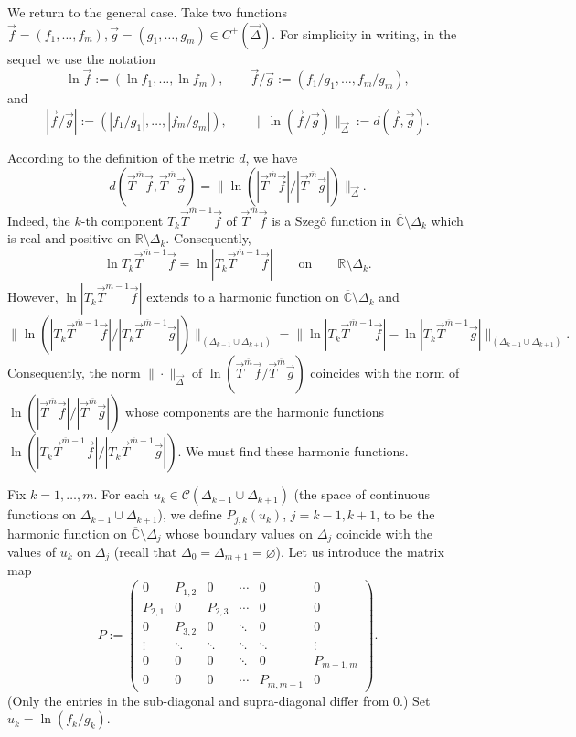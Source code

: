 \documentclass{amsart}
\numberwithin{equation}{section}
\theoremstyle{definition}
\newcommand{\RR}{\mathbb{R}}      %
\newcommand{\CC}{\mathbb{C}}      %
\begin{document}
 We return to the general case. Take two functions $\vec{f} = (f_1,\ldots,f_m), \vec{g} = (g_1,\ldots,g_m) \in {C}^+( \vec{\Delta}) $. For simplicity in writing, in the sequel we use the notation
 \[ \ln \vec{f} := (\ln f_1,\ldots, \ln f_m), \qquad  { \vec{f}}/{ \vec{g}} := (f_1/g_1,\ldots,f_m/g_m),
 \]
 and
 \[ |{ \vec{f}}/{ \vec{g}}| := (|f_1/g_1|,\ldots,|f_m/g_m|), \qquad \|\ln({ \vec{f}}/{ \vec{g}} )\|_{\vec{\Delta}} := d(\vec{f},\vec{g}).
 \]

According to the definition of the metric $d$, we have
 \begin{equation}
 	\label{formulad}
 	d( \vec{T}^{\overline{m}}\vec{f}, \vec{T}^{\overline{m}} \vec{g} ) =  \| \ln (|\vec{T}^{\overline{m}} \vec{f}|/|\vec{T}^{\overline{m}} \vec{g}| )\|_{\vec{\Delta}}.
 \end{equation}
 Indeed, the $k$-th component $T_k \vec{T}^{\overline{m}-1}\vec{f} $ of $\vec{T}^{\overline{m}}\vec{f}$ is a Szeg\H{o} function in $\overline{\CC} \setminus \Delta_k$ which is real and positive on $\RR \setminus \Delta_k$. Consequently,
 \[
   \ln T_k \vec{T}^{\overline{m}-1}\vec{f}= \ln |T_k \vec{T}^{\overline{m}-1}\vec{f}|\qquad  \mbox{on}\qquad {\RR \setminus \Delta_k}.
 \]
 However, $\ln |T_k \vec{T}^{\overline{m}-1}\vec{f}|$ extends to a harmonic function on $\overline{\CC} \setminus \Delta_k$ and
 \[
   \| \ln  (|T_k \vec{T}^{\overline{m}-1}\vec{f}|/|T_k \vec{T}^{\overline{m}-1}\vec{g}|) \|_{(\Delta_{k-1} \cup \Delta_{k+1})} = \| \ln  |T_k \vec{T}^{\overline{m}-1}\vec{f}| -  \ln  |T_k \vec{T}^{\overline{m}-1}\vec{g}| \|_{(\Delta_{k-1} \cup \Delta_{k+1})}.
 \]
  Consequently, the norm $\|\cdot\|_{\vec{\Delta}}$ of $\ln (\vec{T}^{\overline{m}}\vec{f}/ \vec{T}^{\overline{m}}  \vec{g})$ coincides with the norm of $\ln (|\vec{T}^{\overline{m}} \vec{f}|/|\vec{T}^{\overline{m}} \vec{g}| )$ whose components are the harmonic functions $\ln  (|T_k \vec{T}^{\overline{m}-1}\vec{f}|/|T_k \vec{T}^{\overline{m}-1}\vec{g}|)$. We must find these harmonic functions.

 Fix $k =1,\ldots,m$. For each $u_k \in \mathcal{C}({\Delta_{k-1} \cup \Delta_{k+1}})$ (the space of continuous functions on ${\Delta_{k-1} \cup \Delta_{k+1}}$), we define $P_{j,k}(u_k)$, $j=k-1,k+1$, to be the harmonic function on $\overline{\CC} \setminus \Delta_{j}$ whose boundary values on $\Delta_j$ coincide with the values of $u_k$ on $\Delta_j$ (recall that $\Delta_0 = \Delta_{m+1} = \varnothing$). Let us introduce the matrix map
 \begin{equation} \label{P}
    P := \left(
    \begin{array}{cccccc}
    0 & P_{1,2} & 0 & \cdots & 0 & 0 \\
    P_{2,1}& 0 & P_{2,3} & \cdots & 0 & 0 \\
    0 & P_{3,2} & 0 & \ddots & 0 & 0 \\
    \vdots & \ddots & \ddots & \ddots& \ddots & \vdots \\
    0 & 0 & 0 & \ddots & 0& P_{m-1,m} \\
    0 & 0 & 0 & \cdots & P_{m,m-1}& 0
    \end{array}
    \right).
 \end{equation}
 (Only the entries in the sub-diagonal and supra-diagonal differ from $0$.) Set $u_k = \ln (f_k/g_k)$.
\end{document}
